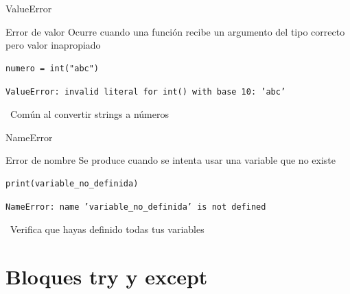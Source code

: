 \documentclass{beamer}
\begin{document}
\begin{frame}[fragile]{ValueError \faExclamation}
\begin{conceptbox}{Error de valor}
Ocurre cuando una función recibe un argumento del tipo correcto pero valor inapropiado
\end{conceptbox}

\begin{lstlisting}
numero = int("abc")
\end{lstlisting}

\vspace{-0.2cm}
\begin{tcolorbox}[colback=red!10,colframe=red,title={\small\faExclamationTriangle \ Error},coltitle=fg0,left=3pt,right=3pt,top=2pt,bottom=2pt,boxsep=1pt]
\small\texttt{ValueError: invalid literal for int() with base 10: 'abc'}
\end{tcolorbox}

\vspace{-0.1cm}
\begin{notebox}
\small\faLightbulb\ Común al convertir strings a números
\end{notebox}
\end{frame}

\begin{frame}[fragile]{NameError \faQuestion}
\begin{conceptbox}{Error de nombre}
Se produce cuando se intenta usar una variable que no existe
\end{conceptbox}

\begin{lstlisting}
print(variable_no_definida)
\end{lstlisting}

\vspace{-0.2cm}
\begin{tcolorbox}[colback=red!10,colframe=red,title={\small\faExclamationTriangle \ Error},coltitle=fg0,left=3pt,right=3pt,top=2pt,bottom=2pt,boxsep=1pt]
\small\texttt{NameError: name 'variable\_no\_definida' is not defined}
\end{tcolorbox}

\vspace{-0.1cm}
\begin{notebox}
\small\faInfoCircle\ Verifica que hayas definido todas tus variables
\end{notebox}
\end{frame}

\section{Bloques try y except}
\end{document}
